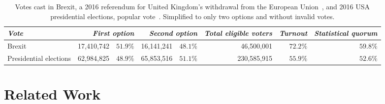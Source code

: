 \documentclass[chi_draft]{sigchi}
\begin{document}
\begin{table}
  \centering
  \begin{tabular}{l r r r r r r r}
    {\small\textit{Vote}} & \multicolumn{2}{r}{\small \textit{First option}} & \multicolumn{2}{r}{\small \textit{Second option}} & {\small \textit{Total eligible voters}} & {\small \textit{Turnout}} & {\small \textit{Statistical quorum}} \\
    \midrule
    Brexit & 17,410,742 & $51.9\%$ & 16,141,241 & $48.1\%$ & 46,500,001 & $72.2\%$ & $59.8\%$ \\
    Presidential elections & 62,984,825 & $48.9\%$ & 65,853,516 & $51.1\%$ & 230,585,915 & $55.9\%$ & $52.6\%$ \\
  \end{tabular}
  \caption{Votes cast in Brexit, a 2016 referendum for United Kingdom's withdrawal from the European Union~\protect\cite{brexitresults},
  and 2016 USA presidential elections, popular vote~\protect\cite{usaresults1,usaresults2}. Simplified to only two options and without invalid votes.}\label{tab:example}
\end{table}






%
%
%
%
%
%
%


\section{Related Work}

\end{document}
